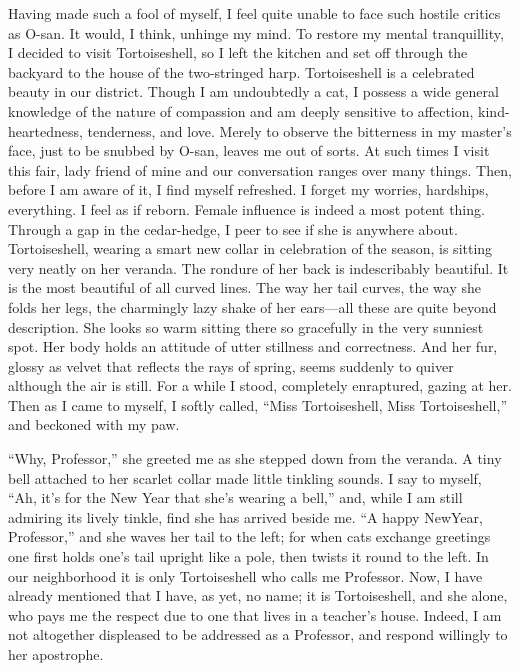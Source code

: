 \documentclass[12pt, openright]{book}
\begin{document}
Having made such a fool of myself, I feel quite unable to face such
hostile critics as O-san. It would, I think, unhinge my mind. To restore
my mental tranquillity, I decided to visit Tortoiseshell, so I left the
kitchen and set off through the backyard to the house of the
two-stringed harp. Tortoiseshell is a celebrated beauty in our district.
Though I am undoubtedly a cat, I possess a wide general knowledge of the
nature of compassion and am deeply sensitive to affection,
kind-heartedness, tenderness, and love. Merely to observe the bitterness
in my master's face, just to be snubbed by O-san, leaves me out of
sorts. At such times I visit this fair, lady friend of mine and our
conversation ranges over many things. Then, before I am aware of it, I
find myself refreshed. I forget my worries, hardships, everything. I
feel as if reborn. Female influence is indeed a most potent thing.
Through a gap in the cedar-hedge, I peer to see if she is anywhere
about. Tortoiseshell, wearing a smart new collar in celebration of the
season, is sitting very neatly on her veranda. The rondure of her back
is indescribably beautiful. It is the most beautiful of all curved
lines. The way her tail curves, the way she folds her legs, the
charmingly lazy shake of her ears---all these are quite beyond
description. She looks so warm sitting there so gracefully in the very
sunniest spot. Her body holds an attitude of utter stillness and
correctness. And her fur, glossy as velvet that reflects the rays of
spring, seems suddenly to quiver although the air is still. For a while
I stood, completely enraptured, gazing at her. Then as I came to myself,
I softly called, ``Miss Tortoiseshell, Miss Tortoiseshell,'' and
beckoned with my paw.

``Why, Professor,'' she greeted me as she stepped down from the veranda.
A tiny bell attached to her scarlet collar made little tinkling sounds.
I say to myself, ``Ah, it's for the New Year that she's wearing a
bell,'' and, while I am still admiring its lively tinkle, find she has
arrived beside me. ``A happy NewYear, Professor,'' and she waves her
tail to the left; for when cats exchange greetings one first holds one's
tail upright like a pole, then twists it round to the left. In our
neighborhood it is only Tortoiseshell who calls me Professor. Now, I
have already mentioned that I have, as yet, no name; it is
Tortoiseshell, and she alone, who pays me the respect due to one that
lives in a teacher's house. Indeed, I am not altogether displeased to be
addressed as a Professor, and respond willingly to her apostrophe.
\end{document}
